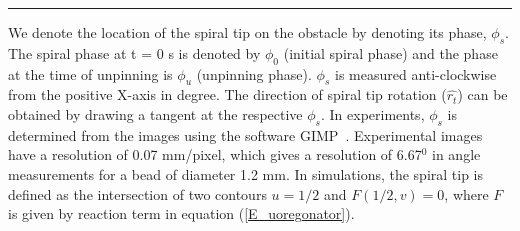 \documentclass[%
 preprint,
 amsmath,amssymb,
 aps,
]{revtex4-2}
\begin{document}
\vspace{5pt}
\hrule
\vspace{5pt}


We denote the location of the spiral tip on the obstacle by denoting its phase, $\phi_s$. The spiral phase at t = 0 s is denoted by $\phi_0$ (initial spiral phase) and the phase at the time of unpinning is $\phi_u$ (unpinning phase). $\phi_s$ is measured anti-clockwise from the positive X-axis in degree.
The direction of spiral tip rotation ($\hat{r_t}$) can be obtained by drawing a tangent at the respective $\phi_{s}$. In experiments, $\phi_s$ is determined from the images using the software GIMP~\cite{gimp}.
Experimental images have a resolution of 0.07 mm/pixel, which gives a resolution of 6.67$^0$ in angle measurements for a bead of diameter 1.2 mm.
In simulations, the spiral tip is defined as the intersection of two contours
$u=1/2$ and $F(1/2,v) = 0$, where $F$ is given by reaction term in equation 
(\ref{E_uoregonator})\cite{barkley1991model}.

\end{document}
